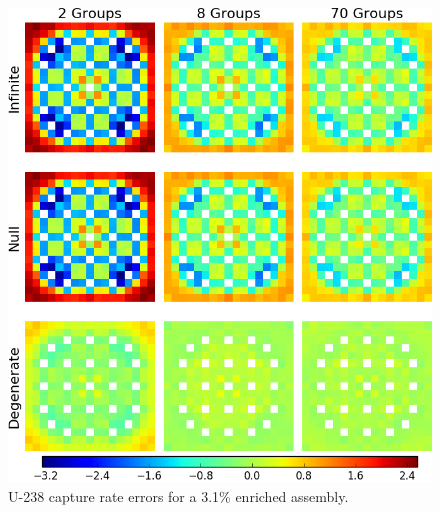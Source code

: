 \begin{figure}[h!]
\centering
\includegraphics[width=\linewidth]{figures/quantification/assm-31/capt-err}
\caption[U-238 capture rate errors for a 3.1\% enriched assembly]{U-238 capture rate errors for a 3.1\% enriched assembly.}
\label{fig:chap8-assm-3.1-capt-err}
\end{figure}

